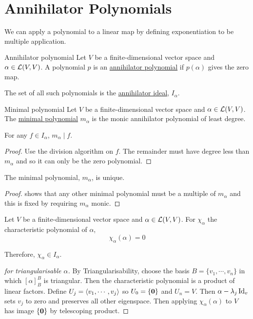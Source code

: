 \documentclass[../Main.tex]{subfiles}
\begin{document}
\section{Annihilator Polynomials}
We can apply a polynomial to a linear map by defining exponentiation to be multiple application.

\begin{definition}{Annihilator polynomial}
    Let $V$ be a finite-dimensional vector space and $\alpha \in \mathcal{L}(V, V)$. A polynomial $p$ is an \underline{annihilator polynomial} if $p(\alpha)$ gives the zero map.
\end{definition}
The set of all such polynomials is the \underline{annihilator ideal}, $I_\alpha$.
\begin{definition}{Minimal polynomial}
    Let $V$ be a finite-dimensional vector space and $\alpha \in \mathcal{L}(V, V)$. The \underline{minimal polynomial} $m_\alpha$ is the monic annihilator polynomial of least degree.
\end{definition}
\begin{lemma}
    For any $f \in I_\alpha$, $m_\alpha \mid f$.
    \label{lemMinimalDividesAnnihPoly}
\end{lemma}
\begin{proof}
    Use the division algorithm on $f$. The remainder must have degree less than $m_\alpha$ and so it can only be the zero polynomial.
\end{proof}
\begin{theorem}
    The minimal polynomial, $m_\alpha$, is unique.
    \label{thmMinPolyUnique}
\end{theorem}
\begin{proof}
     shows that any other minimal polynomial must be a multiple of $m_\alpha$ and this is fixed by requiring $m_\alpha$ monic.
\end{proof}
\begin{theorem}
    Let $V$ be a finite-dimensional vector space and $\alpha \in \mathcal{L}(V, V)$. For $\chi_\alpha$ the characteristic polynomial of $\alpha$,
    \begin{equation*}
        \chi_\alpha(\alpha) = 0
    \end{equation*}
    \label{thmCayleyHamilton}
\end{theorem}
\begin{remark}
    Therefore, $\chi_\alpha \in I_\alpha$.
\end{remark}
\begin{proof}[for triangularisable $\alpha$]
    By Triangularisability, choose the basis $B = \{v_1, \cdots, v_n\}$ in which $[\alpha]_B^B$ is triangular. Then the characteristic polynomial is a product of linear factors. Define $U_j = \left\langle v_1, \cdots, v_j \right\rangle$ so $U_0 = \{\boldsymbol{0}\}$ and $U_n = V$. Then $\alpha - \lambda_j \operatorname{Id}_v$ sets $v_j$ to zero and preserves all other eigenspace. Then applying $\chi_\alpha(\alpha)$ to $V$ has image $\{\boldsymbol{0}\}$ by telescoping product.
\end{proof}
\end{document}
